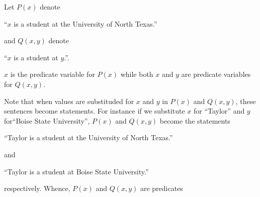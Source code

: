 \guard



\begin{exmp}
\label{exmp:predicates}
  Let $P(x)$ denote
    \begin{center}
      ``$x$ is a student at the University of North Texas.''
    \end{center}
    and $Q(x,y)$ denote
    \begin{center}
      ``$x$ is a student at $y$.''.
    \end{center}
  $x$ is the predicate variable for $P(x)$ while both $x$ and $y$ are predicate variables for $Q(x,y)$.

  Note that when values are substituded for $x$ and $y$ in $P(x)$ and $Q(x,y)$, these sentences become statements.
  For instance if we substitute $x$ for ``Taylor'' and $y$ for``Boise State University'', $P(x)$ and $Q(x,y)$ become the statements
    \begin{center}
      ``Taylor is a student at the University of North Texas.''
    \end{center}
    and
    \begin{center}
      ``Taylor is a student at Boise State University.''
    \end{center}
    respectively.
  Whence, $P(x)$ and $Q(x,y)$ are predicates
\end{exmp}
